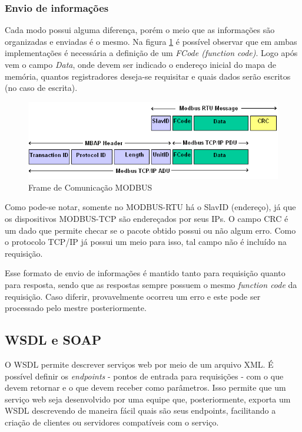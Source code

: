       \subsubsection{Envio de informações}

        Cada modo possui alguma diferença, porém o meio que as informações são organizadas e enviadas é o mesmo. Na figura \ref{fig:modbus-frame} é possível observar que em ambas implementações é necessária a definição de um \textit{FCode (function code)}. Logo após vem o campo \textit{Data}, onde devem ser indicado o endereço inicial do mapa de memória, quantos registradores deseja-se requisitar e quais dados serão escritos (no caso de escrita).

        \begin{figure}[H]
          \begin{center}
            \includegraphics[width=\textwidth,natwidth=585,natheight=180]{assets/images/modbus-frame.png}
            \caption{Frame de Comunicação MODBUS}
            \label{fig:modbus-frame}
          \end{center}
        \end{figure}

        Como pode-se notar, somente no MODBUS-RTU há o SlavID (endereço), já que os dispositivos MODBUS-TCP são endereçados por seus IPs. O campo CRC é um dado que permite checar se o pacote obtido possui ou não algum erro. Como o protocolo TCP/IP já possui um meio para isso, tal campo não é incluído na requisição.

        Esse formato de envio de informações é mantido tanto para requisição quanto para resposta, sendo que as respostas sempre possuem o mesmo \textit{function code} da requisição. Caso diferir, provavelmente ocorreu um erro e este pode ser processado pelo mestre posteriormente.

    \subsection{WSDL e SOAP}

      O WSDL \cite{w3c-spec-wsdl} permite descrever serviços web por meio de um arquivo \ac{XML}. É possível definir os \textit{endpoints} - pontos de entrada para requisições - com o que devem retornar e o que devem receber como parâmetros. Isso permite que um serviço web seja desenvolvido por uma equipe que, posteriormente, exporta um WSDL descrevendo de maneira fácil quais são seus endpoints, facilitando a criação de clientes ou servidores compatíveis com o serviço.

